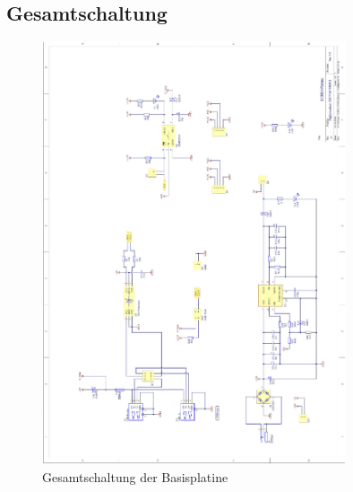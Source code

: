 \subsection{Gesamtschaltung}
\label{sec:basisplatine-schaltung}
\begin{figure}[htb]
    \centering
    \includegraphics[width=0.8\textwidth]{Schuh/Pictures/Basis-Schaltung1}
    \caption[Gesamtschaltung der Basisplatine]{Gesamtschaltung der \gls{Basisplatine}}
    \label{fig:basisplatine-schaltung}
\end{figure}
